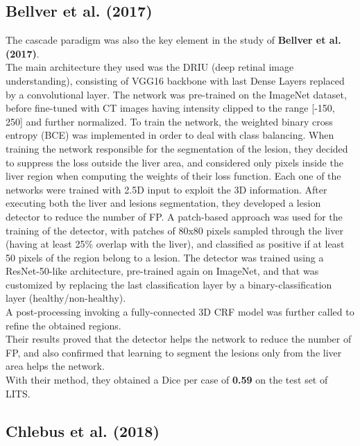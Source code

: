 \subsection{Bellver et al. (2017)}\label{bellver-et-al.-2017}

The cascade paradigm was also the key element in the study of
\textbf{Bellver et al. (2017)}.\\
The main architecture they used was the DRIU (deep retinal image
understanding), consisting of VGG16 backbone with last Dense Layers
replaced by a convolutional layer. The network was pre-trained on the ImageNet dataset, before fine-tuned
with CT images having intensity clipped to the range {[}-150, 250{]} and
further normalized.
To train the network, the weighted binary cross entropy (BCE) was
implemented in order to deal with class balancing. When training the
network responsible for the segmentation of the lesion, they decided to
suppress the loss outside the liver area, and considered only pixels
inside the liver region when computing the weights of their loss
function. Each one of the networks were trained with 2.5D input to
exploit the 3D information.
After executing both the liver and lesions segmentation, they developed
a lesion detector to reduce the number of FP. A patch-based approach was
used for the training of the detector, with patches of 80x80 pixels
sampled through the liver (having at least 25\% overlap with the liver),
and classified as positive if at least 50 pixels of the region belong to
a lesion.
The detector was trained using a ResNet-50-like architecture,
pre-trained again on ImageNet, and that was customized by replacing the
last classification layer by a binary-classification layer
(healthy/non-healthy).\\
A post-processing invoking a fully-connected 3D CRF model was further
called to refine the obtained regions.\\
Their results proved that the detector helps the network to reduce the
number of FP, and also confirmed that learning to segment the lesions
only from the liver area helps the network.\\
With their method, they obtained a Dice per case of \textbf{0.59} on the
test set of LITS.

\subsection{Chlebus et al. (2018)}\label{chlebus-et-al.-2018}

